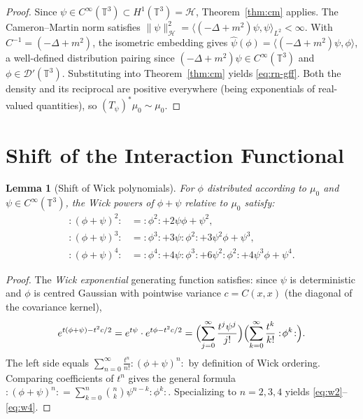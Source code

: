 \documentclass[12pt]{article}
\newtheorem{lemma}[theorem]{Lemma}
\theoremstyle{definition}
\begin{document}
\begin{proof}
Since $\psi \in C^\infty(\mathbb{T}^3) \subset H^1(\mathbb{T}^3) = \mathcal{H}$,
Theorem~\ref{thm:cm} applies. The Cameron--Martin norm satisfies
$\|\psi\|_{\mathcal{H}}^2 = \langle(-\Delta+m^2)\psi,\psi\rangle_{L^2} < \infty$.
With $C^{-1} = (-\Delta+m^2)$, the isometric embedding gives
$\widehat{\psi}(\phi) = \langle(-\Delta+m^2)\psi, \phi\rangle$, a well-defined
distribution pairing since $(-\Delta+m^2)\psi \in C^\infty(\mathbb{T}^3)$ and
$\phi \in \mathcal{D}'(\mathbb{T}^3)$. Substituting into Theorem~\ref{thm:cm} yields
\eqref{eq:rn-gff}. Both the density and its reciprocal are positive everywhere (being
exponentials of real-valued quantities), so $(T_\psi)^*\mu_0 \sim \mu_0$.
\end{proof}

\section{Shift of the Interaction Functional}

\begin{lemma}[Shift of Wick polynomials]
\label{lem:wick-shift}
For $\phi$ distributed according to $\mu_0$ and $\psi \in C^\infty(\mathbb{T}^3)$, the Wick
powers of $\phi + \psi$ relative to $\mu_0$ satisfy:
\begin{align}
  :(\phi+\psi)^2: &= :\!\phi^2\!: + 2\psi\phi + \psi^2,\label{eq:w2}\\
  :(\phi+\psi)^3: &= :\!\phi^3\!: + 3\psi:\!\phi^2\!: + 3\psi^2\phi + \psi^3,\label{eq:w3}\\
  :(\phi+\psi)^4: &= :\!\phi^4\!: + 4\psi:\!\phi^3\!: + 6\psi^2:\!\phi^2\!:
                     + 4\psi^3\phi + \psi^4.\label{eq:w4}
\end{align}
\end{lemma}

\begin{proof}
The \emph{Wick exponential} generating function satisfies: since $\psi$ is deterministic and
$\phi$ is centred Gaussian with pointwise variance $c = C(x,x)$ (the diagonal of the covariance
kernel),
\[
  e^{t(\phi+\psi) - t^2c/2}
  = e^{t\psi} \cdot e^{t\phi - t^2c/2}
  = \Bigl(\sum_{j=0}^\infty \frac{t^j\psi^j}{j!}\Bigr)
    \Bigl(\sum_{k=0}^\infty \frac{t^k}{k!}:\!\phi^k\!:\Bigr).
\]
The left side equals $\sum_{n=0}^\infty \frac{t^n}{n!}:(\phi+\psi)^n:$ by definition of Wick
ordering. Comparing coefficients of $t^n$ gives the general formula
$:(\phi+\psi)^n: = \sum_{k=0}^{n}\binom{n}{k}\psi^{n-k}:\!\phi^k\!:$. Specializing to
$n = 2, 3, 4$ yields \eqref{eq:w2}--\eqref{eq:w4}.
\end{proof}
\end{document}
